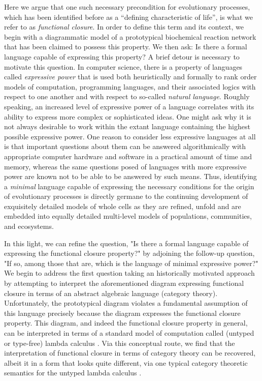 Here we argue that one such necessary precondition for evolutionary processes, which has been identified before as a ``defining characteristic of life''\cite{Rosen1972,Rosen1978,Rosen1985,Rosen1991}, is what we refer to as \emph{functional closure}. In order to define this term and its context, we begin with a diagrammatic model of a prototypical biochemical reaction network that has been claimed to possess this property. We then ask: Is there a formal language capable of expressing this property? A brief detour is necessary to motivate this question. In computer science, there is a property of languages called \emph{expressive power} that is used both heuristically and formally to rank order models of computation, programming languages, and their associated logics with respect to one another and with respect to so-called \emph{natural language}. Roughly speaking, an increased level of expressive power of a language correlates with its ability to express more complex or sophisticated ideas. One might ask why it is not always desirable to work within the extant language containing the highest possible expressive power. One reason to consider less expressive languages at all is that important questions about them can be answered algorithmically with appropriate computer hardware and software in a practical amount of time and memory, whereas the same questions posed of languages with more expressive power are known not to be able to be answered by such means\cite{Hopcroft2007}. Thus, identifying a \emph{minimal} language capable of expressing the necessary conditions for the origin of evolutionary processes is directly germane to the continuing development of exquisitely detailed models of whole cells as they are refined, unfold and are embedded into equally detailed multi-level models of populations, communities, and ecosystems.

In this light, we can refine the question, "Is there a formal language capable of expressing the functional closure property?" by adjoining the follow-up question, "If so, among those that are, which is the language of minimal expressive power?" We begin to address the first question taking an historically motivated approach \cite{Rosen1972,Letelier2006} by attempting to interpret the aforementioned diagram expressing functional closure in terms of an abstract algebraic language (category theory). Unfortunately, the prototypical diagram violates a fundamental assumption of this language precisely because the diagram expresses the functional closure property. This diagram, and indeed the functional closure property in general, can be interpreted in terms of a standard model of computation called (untyped or type-free) lambda calculus \cite{Mossio2009}. Via this conceptual route, we find that the interpretation of functional closure in terms of category theory can be recovered, albeit it in a form that looks quite different, via one typical category theoretic semantics for the untyped lambda calculus \cite{Scott1980,Barendregt1985,Abramsky1995}.

